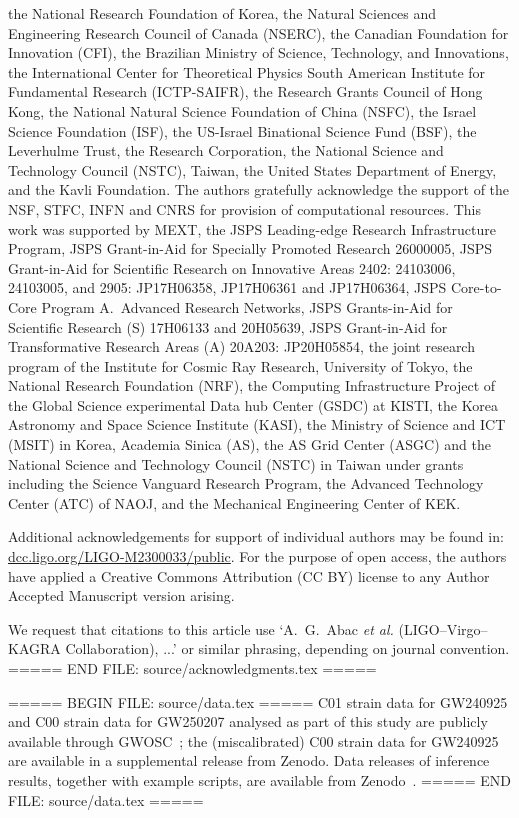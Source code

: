 the National Research Foundation of Korea,
the Natural Sciences and Engineering Research Council of Canada (NSERC),
the Canadian Foundation for Innovation (CFI),
the Brazilian Ministry of Science, Technology, and Innovations,
the International Center for Theoretical Physics South American Institute for Fundamental Research (ICTP-SAIFR),
the Research Grants Council of Hong Kong,
the National Natural Science Foundation of China (NSFC),
the Israel Science Foundation (ISF),
the US-Israel Binational Science Fund (BSF),
the Leverhulme Trust,
the Research Corporation,
the National Science and Technology Council (NSTC), Taiwan,
the United States Department of Energy,
and
the Kavli Foundation.
The authors gratefully acknowledge the support of the NSF, STFC, INFN and CNRS for provision of computational resources.
This work was supported by MEXT,
the JSPS Leading-edge Research Infrastructure Program,
JSPS Grant-in-Aid for Specially Promoted Research 26000005,
JSPS Grant-in-Aid for Scientific Research on Innovative Areas 2402: 24103006,
24103005, and 2905: JP17H06358, JP17H06361 and JP17H06364,
JSPS Core-to-Core Program A.\ Advanced Research Networks,
JSPS Grants-in-Aid for Scientific Research (S) 17H06133 and 20H05639,
JSPS Grant-in-Aid for Transformative Research Areas (A) 20A203: JP20H05854,
the joint research program of the Institute for Cosmic Ray Research,
University of Tokyo,
the National Research Foundation (NRF),
the Computing Infrastructure Project of the Global Science experimental Data hub
Center (GSDC) at KISTI,
the Korea Astronomy and Space Science Institute (KASI),
the Ministry of Science and ICT (MSIT) in Korea,
Academia Sinica (AS),
the AS Grid Center (ASGC) and the National Science and Technology Council (NSTC)
in Taiwan under grants including the Science Vanguard Research Program,
the Advanced Technology Center (ATC) of NAOJ,
and the Mechanical Engineering Center of KEK.

Additional acknowledgements for support of individual authors may be found in: \href{https://dcc.ligo.org/LIGO-M2300033/public}{dcc.ligo.org/LIGO-M2300033/public}.
For the purpose of open access, the authors have applied a Creative Commons Attribution (CC BY)
license to any Author Accepted Manuscript version arising.

We request that citations to this article use `A.\ G.\ Abac {\it et al.} (LIGO--Virgo--KAGRA Collaboration), ...' or similar phrasing, depending on journal convention.
===== END FILE: source/acknowledgments.tex =====

===== BEGIN FILE: source/data.tex =====
\ac{C01} strain data for \ac{GW240925} and \ac{C00} strain data for \ac{GW250207} analysed as part of this study are publicly available through \ac{GWOSC}~\cite{gwosc:GW240925,gwosc:GW250207,LIGOScientific:2025snk}; the (miscalibrated) \ac{C00} strain data for \ac{GW240925} are available in a supplemental release from Zenodo.
Data releases of inference results, together with example scripts, are available from Zenodo~\cite{data-release}.
===== END FILE: source/data.tex =====

